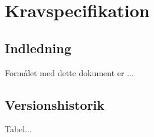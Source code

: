 \chapter{Kravspecifikation}

\section{Indledning}
Formålet med dette dokument er ...
\section{Versionshistorik}
Tabel...